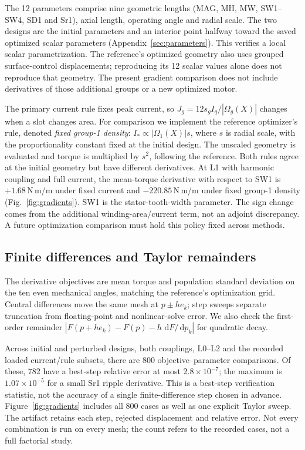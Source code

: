 \documentclass{anvil-paper}
\newcommand{\dd}{\,\mathrm{d}}
\begin{document}
The 12 parameters comprise nine geometric lengths (MAG, MH, MW,
SW1--SW4, SD1 and Sr1), axial length, operating angle and radial scale.
The two designs are the initial parameters and an interior point halfway
toward the saved optimized scalar parameters
(Appendix~\ref{sec:parameters}). This verifies a local scalar
parametrization. The reference's optimized geometry also uses grouped
surface-control displacements; reproducing its 12 scalar values alone
does not reproduce that geometry. The present gradient comparison does
not include derivatives of those additional groups or a new optimized
motor.

The primary current rule fixes peak current, so
$J_g=12s_g I_q/|\Omega_g(X)|$ changes when a slot changes area.
For comparison we implement the reference optimizer's rule, denoted
\emph{fixed group-1 density}: $I_*\propto |\Omega_1(X)|s$, where $s$ is
radial scale, with the proportionality constant fixed at the initial
design. The unscaled geometry is evaluated and torque is multiplied by
$s^2$, following the reference. Both rules agree at the initial geometry
but have different derivatives. At L1 with harmonic coupling and full
current, the mean-torque derivative with respect to SW1 is
$+1.68$\,N\,m/m under fixed current and $-220.85$\,N\,m/m under fixed
group-1 density (Fig.~\ref{fig:gradients}). SW1 is the stator-tooth-width
parameter. The sign change comes from the additional winding-area/current
term, not an adjoint discrepancy. A future optimization comparison must
hold this policy fixed across methods.

\subsection{Finite differences and Taylor remainders}
The derivative objectives are mean torque and population standard
deviation on the ten even mechanical angles, matching the reference's
optimization grid. Central differences move the same mesh at $p\pm h e_k$;
step sweeps separate truncation from floating-point and nonlinear-solve
error. We also check the first-order remainder
$|F(p+h e_k)-F(p)-h\,\dd F/\dd p_k|$ for quadratic decay.

Across initial and perturbed designs, both couplings, L0--L2 and the
recorded loaded current/rule subsets, there are 800 objective--parameter
comparisons. Of these, 782 have a best-step relative error at most
$2.8\times10^{-7}$; the maximum is $1.07\times10^{-5}$ for a small Sr1
ripple derivative. This is a best-step verification statistic, not the
accuracy of a single finite-difference step chosen in advance.
Figure~\ref{fig:gradients} includes all 800 cases as well as one explicit
Taylor sweep. The artifact retains each step, rejected displacement and
relative error. Not every combination is run on every mesh; the count
refers to the recorded cases, not a full factorial study.
\end{document}
